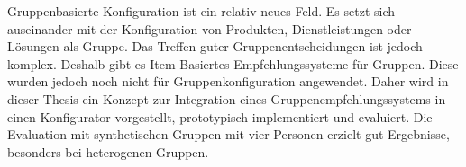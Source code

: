 \Abstract

Gruppenbasierte Konfiguration ist ein relativ neues Feld. Es setzt sich auseinander mit der Konfiguration von Produkten, Dienstleistungen oder Lösungen als Gruppe. Das Treffen guter Gruppenentscheidungen ist jedoch komplex. Deshalb gibt es Item-Basiertes-Empfehlungssysteme für Gruppen. Diese wurden jedoch noch nicht für Gruppenkonfiguration angewendet. Daher wird in dieser Thesis ein Konzept zur Integration eines Gruppenempfehlungssystems in einen Konfigurator vorgestellt, prototypisch implementiert und evaluiert. Die Evaluation mit synthetischen Gruppen mit vier Personen erzielt gut Ergebnisse, besonders bei heterogenen Gruppen.